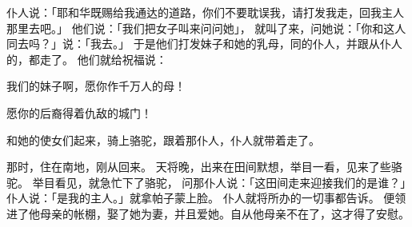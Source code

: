 {仆人说：「耶和华既赐给我通达的道路，你们不要耽误我，请打发我走，回我主人那里去吧。」
他们说：「我们把女子叫来问问她」，
就叫了{}来，问她说：「你和这人同去吗？」{}说：「我去。」
于是他们打发妹子{}和她的乳母，同{}的仆人，并跟从仆人的，都走了。
他们就给{}祝福说：
\par }{\Q 我们的妹子啊，愿你作千万人的母！
\par }{\Q 愿你的后裔得着仇敌的城门！
\par }{\PP {}和她的使女们起来，骑上骆驼，跟着那仆人，仆人就带着{}走了。
\par }{\PP {}那时，{}住在南地，刚从{}回来。
天将晚，{}出来在田间默想，举目一看，见来了些骆驼。
举目看见{}，就急忙下了骆驼，
问那仆人说：「这田间走来迎接我们的是谁？」仆人说：「是我的主人。」{}就拿帕子蒙上脸。
仆人就将所办的一切事都告诉{}。
便领{}进了他母亲{}的帐棚，娶了她为妻，并且爱她。{}自从他母亲不在了，这才得了安慰。

}
